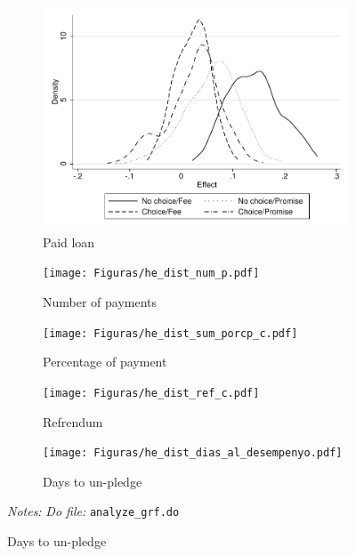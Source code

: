 \documentclass[11pt]{article}
\begin{document}
\begin{figure}[H]
    \caption{Heterogeneous Treatment Effect}
    \label{heterogeneous_te}
    \begin{center}
    \begin{subfigure}{0.4\textwidth}
        \caption{Paid loan}
        \centering
        \includegraphics[width=\textwidth]{Figuras/he_dist_des_c.pdf}
    \end{subfigure}
    \begin{subfigure}{0.4\textwidth}
        \caption{Number of payments}
        \centering
        \texttt{[image: Figuras/he\_dist\_num\_p.pdf]}
    \end{subfigure}
     \begin{subfigure}{0.4\textwidth}
      \caption{Percentage of payment}
        \centering
        \texttt{[image: Figuras/he\_dist\_sum\_porcp\_c.pdf]}
    \end{subfigure}
     \begin{subfigure}{0.4\textwidth}
      \caption{Refrendum}
        \centering
        \texttt{[image: Figuras/he\_dist\_ref\_c.pdf]}
    \end{subfigure}    
    \begin{subfigure}{0.4\textwidth}
      \caption{Days to un-pledge}
        \centering
        \texttt{[image: Figuras/he\_dist\_dias\_al\_desempenyo.pdf]}
    \end{subfigure}    
    \end{center}
     \footnotesize \textit{Notes: } 
      \footnotesize{ \textit{Do file: }  \texttt{analyze\_grf.do}}
\end{figure}
\end{document}
